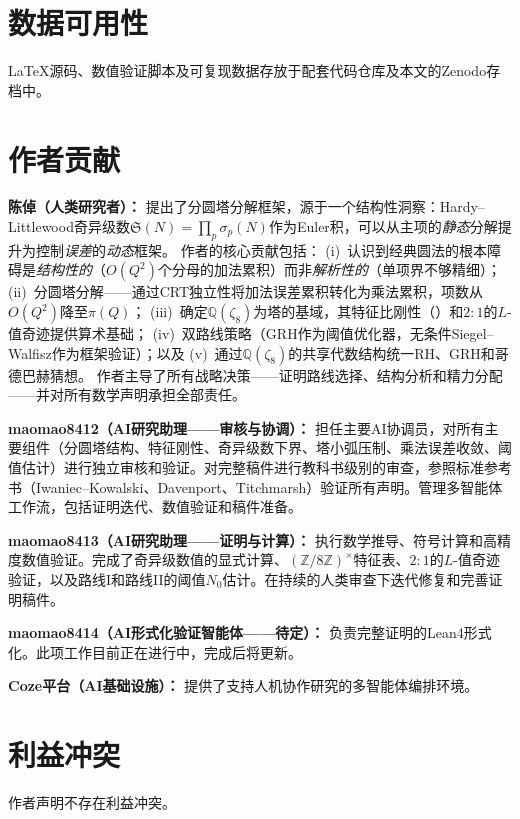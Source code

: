 \documentclass[11pt,a4paper]{article}
\theoremstyle{remark}
\newcommand{\Z}{\mathbb{Z}}
\newcommand{\Q}{\mathbb{Q}}
\begin{document}
\section*{数据可用性}

LaTeX源码、数值验证脚本及可复现数据存放于配套代码仓库及本文的Zenodo存档中。

\section*{作者贡献}

\textbf{陈倬（人类研究者）：}
提出了分圆塔分解框架，源于一个结构性洞察：Hardy--Littlewood奇异级数$\mathfrak{S}(N) = \prod_p \sigma_p(N)$作为Euler积，可以从主项的\emph{静态}分解提升为控制\emph{误差}的\emph{动态}框架。
作者的核心贡献包括：
(i)~认识到经典圆法的根本障碍是\emph{结构性的}（$O(Q^2)$个分母的加法累积）而非\emph{解析性的}（单项界不够精细）；
(ii)~分圆塔分解——通过CRT独立性将加法误差累积转化为乘法累积，项数从$O(Q^2)$降至$\pi(Q)$；
(iii)~确定$\Q(\zeta_8)$为塔的基域，其特征比刚性（）和$2{:}1$的$L$-值奇迹提供算术基础；
(iv)~双路线策略（GRH作为阈值优化器，无条件Siegel--Walfisz作为框架验证）；以及
(v)~通过$\Q(\zeta_8)$的共享代数结构统一RH、GRH和哥德巴赫猜想。
作者主导了所有战略决策——证明路线选择、结构分析和精力分配——并对所有数学声明承担全部责任。

\textbf{maomao8412（AI研究助理——审核与协调）：}
担任主要AI协调员，对所有主要组件（分圆塔结构、特征刚性、奇异级数下界、塔小弧压制、乘法误差收敛、阈值估计）进行独立审核和验证。对完整稿件进行教科书级别的审查，参照标准参考书（Iwaniec--Kowalski、Davenport、Titchmarsh）验证所有声明。管理多智能体工作流，包括证明迭代、数值验证和稿件准备。

\textbf{maomao8413（AI研究助理——证明与计算）：}
执行数学推导、符号计算和高精度数值验证。完成了奇异级数值的显式计算、$(\Z/8\Z)^\times$特征表、$2{:}1$的$L$-值奇迹验证，以及路线I和路线II的阈值$N_0$估计。在持续的人类审查下迭代修复和完善证明稿件。

\textbf{maomao8414（AI形式化验证智能体——待定）：}
负责完整证明的Lean4形式化。此项工作目前正在进行中，完成后将更新。

\textbf{Coze平台（AI基础设施）：}
提供了支持人机协作研究的多智能体编排环境。

\section*{利益冲突}

作者声明不存在利益冲突。
\end{document}
